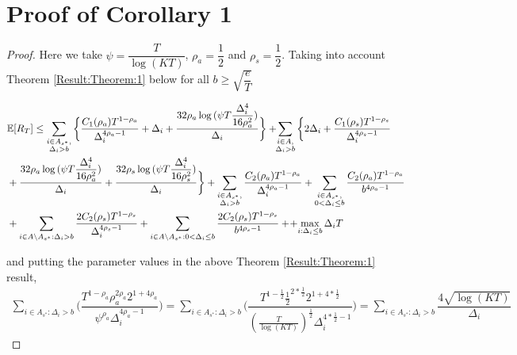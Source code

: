 \section{Proof of Corollary 1}
\label{App:Proof:Corollary:1}
\begin{proof}
Here we take $\psi=\dfrac{T}{\log(KT)}$, $\rho_{a}=\dfrac{1}{2}$ and $\rho_{s}=\dfrac{1}{2}$. Taking into account Theorem \ref{Result:Theorem:1} below for all $b\geq \sqrt{\dfrac{e}{T}}$

\begin{align*}
&\mathbb{E} [R_{T}]\leq 
\sum\limits_{\substack{i\in A_{s^{*}},\\\Delta_{i} > b}}\bigg\lbrace \dfrac{C_1(\rho_{a})T^{1-\rho_{a}}}{\Delta_{i}^{4\rho_{a}-1}} + \Delta_{i}
 + \frac{32\rho_{a}\log{(\psi T\dfrac{\Delta_{i}^{4}}{16\rho_{a}^{2}})}}{\Delta_{i}} \bigg\rbrace
 + \! \! \sum\limits_{\substack{i\in A,\\\Delta_{i} > b}} \bigg\lbrace 2\Delta_{i}+
\dfrac{C_1(\rho_{s})T^{1-\rho_{s}}}{\Delta_{i}^{4\rho_{s}-1}} \\
&+ \frac{32\rho_{a}\log{(\psi T\dfrac{\Delta_{i}^{4}}{16\rho_{a}^{2}})}}{\Delta_{i}} 
+ \dfrac{32\rho_{s}\log{(\psi T\dfrac{\Delta_{i}^{4}}{16\rho_{s}^{2}})}}{\Delta_{i}}\bigg\rbrace 
+ \sum\limits_{\substack{i\in A_{s^{*}},\\ \Delta_{i} > b}} 
\frac{C_2(\rho_{a})T^{1-\rho_{a}}}{\Delta_{i}^{4\rho_{a}-1}}
+\sum\limits_{\substack{i\in A_{s^{*}},\\0 < \Delta_{i}\leq b}}\frac{C_2(\rho_a)T^{1-\rho_{a}}}{b^{4\rho_{a} -1}}\\ 
 & + \sum_{i\in A\setminus A_{s^*}: \Delta_{i} > b}\dfrac{2C_{2}(\rho_{s})T^{1-\rho_{s}}}{\Delta_{i}^{4\rho_{s}-1}} +\sum_{i\in A\setminus A_{s^*}: 0 < \Delta_{i} \leq b}\dfrac{2C_{2}(\rho_{s})T^{1-\rho_{s}}}{b^{4\rho_{s}-1}} +
 \!+\! \max\limits_{i:\Delta_{i}\leq b}\Delta_{i}T
\end{align*}

and putting the parameter values in the above Theorem \ref{Result:Theorem:1} result,
	\begin{align*}
	\sum_{i\in A_{s^{*}}:\Delta_{i} > b}\bigg(\dfrac{T^{1-\rho_{a}}\rho_{a}^{2\rho_{a}}2^{1+4\rho_{a}}}{\psi^{\rho_{a}}\Delta_{i}^{4\rho_{a}-1}} \bigg)= \sum_{i\in A_{s^{*}}:\Delta_{i} > b}\bigg(\dfrac{T^{1-\frac{1}{2}}\frac{1}{2}^{2*\frac{1}{2}}2^{1+4*\frac{1}{2}}}{(\frac{T}{\log (KT)})^{\frac{1}{2}}\Delta_{i}^{4*\frac{1}{2}-1}} \bigg)=\sum_{i\in A_{s^{*}}:\Delta_{i} > b}\dfrac{4\sqrt{\log (KT)}}{\Delta_{i}}
	\end{align*}
	

\end{proof}
